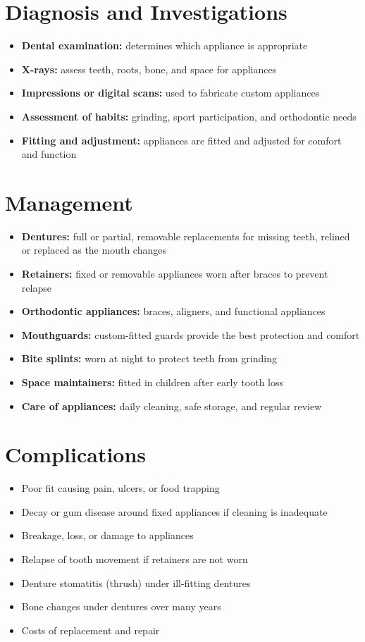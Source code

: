 \section*{Diagnosis and Investigations}
\begin{itemize}
    \item \textbf{Dental examination:} determines which appliance is appropriate
    \item \textbf{X-rays:} assess teeth, roots, bone, and space for appliances
    \item \textbf{Impressions or digital scans:} used to fabricate custom appliances
    \item \textbf{Assessment of habits:} grinding, sport participation, and orthodontic needs
    \item \textbf{Fitting and adjustment:} appliances are fitted and adjusted for comfort and function
\end{itemize}

\section*{Management}
\begin{itemize}
    \item \textbf{Dentures:} full or partial, removable replacements for missing teeth, relined or replaced as the mouth changes
    \item \textbf{Retainers:} fixed or removable appliances worn after braces to prevent relapse
    \item \textbf{Orthodontic appliances:} braces, aligners, and functional appliances
    \item \textbf{Mouthguards:} custom-fitted guards provide the best protection and comfort
    \item \textbf{Bite splints:} worn at night to protect teeth from grinding
    \item \textbf{Space maintainers:} fitted in children after early tooth loss
    \item \textbf{Care of appliances:} daily cleaning, safe storage, and regular review
\end{itemize}

\section*{Complications}
\begin{itemize}
    \item Poor fit causing pain, ulcers, or food trapping
    \item Decay or gum disease around fixed appliances if cleaning is inadequate
    \item Breakage, loss, or damage to appliances
    \item Relapse of tooth movement if retainers are not worn
    \item Denture stomatitis (thrush) under ill-fitting dentures
    \item Bone changes under dentures over many years
    \item Costs of replacement and repair
\end{itemize}


